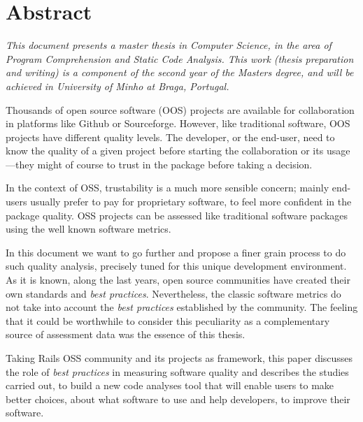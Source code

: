 \thispagestyle{plain}
\chapter*{Abstract}\label{chap:abstract}

{\it
  This document presents a master thesis in Computer Science, in the area of \textit{Program Comprehension and Static Code Analysis}.
  This work (thesis preparation and writing) is a component of the second year of the Masters degree,
  and will be achieved in University of Minho at Braga, Portugal. 

  Thousands of open source software (OOS) projects are available for collaboration in platforms like Github or Sourceforge.
  However, like traditional software, OOS projects have different quality levels.
  The developer, or the end-user, need to know the quality of a given project before starting the collaboration
  or its usage---they might of course to trust in the package before taking a decision.

  In the context of OSS, trustability is a much more sensible concern; mainly end-users usually prefer to pay for
  proprietary software, to feel more confident in the package quality.
  OSS projects can be assessed like traditional software packages using the well known software metrics.

  In this document we want to go further and propose a finer grain process to do such quality analysis,
  precisely tuned for this unique development environment.
  As it is known, along the last years, open source communities have created their own standards and \emph{best practices}.
  Nevertheless, the classic software metrics do not take into account the \emph{best practices}
  established by the community.
  The feeling that it could be worthwhile to consider this peculiarity as a complementary source of assessment data 
  was the essence of this thesis.
  
  Taking Rails OSS community and its projects as framework, this paper discusses the role of
  \emph{best practices} in measuring software quality and describes the studies carried out, to build a new code analyses tool that 
  will enable users to make better choices, about what software to use and help developers, to improve their software.
}
